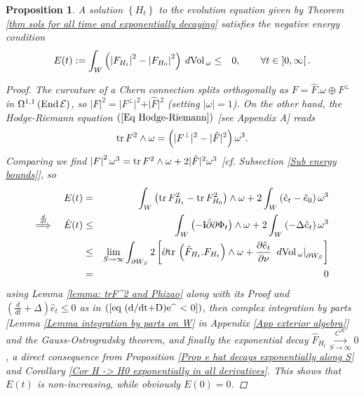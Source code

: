 \documentclass{article}
\newcommand{\func}[1]{\textnormal {#1\,}}
\newcommand{\tublim}{\overset{C^\infty}{\underset{S\rightarrow\infty}{\longrightarrow}}}
\newcommand{\dvol}{\:d\func{Vol}_\omega}
\newtheorem{proposition}[theorem]{Proposition}
\begin{document}
\begin{proposition}     \label{prop negative energy} 
A solution $\left\{H_t\right\}$ to the evolution equation
given by \emph{Theorem \ref{thm sols for all time and exponentially decaying}} satisfies
the \emph{negative energy} condition\begin{eqnarray}        \label{eq uniform energy bound}
        E(t):= \int_{W}
        \left( 
        \left\vert F_{H_{t}}\right\vert^{2}
        -
        \left\vert F_{H_{0}}\right\vert ^{2}
        \right) \dvol%
        &\leq& 
        0,\qquad \forall t\in \left]0,\infty \right[.
\end{eqnarray}%
\begin{proof}
The curvature of a Chern connection splits orthogonally as $F=\hat{F}.\omega  \oplus  F^{\perp }$ in $\Omega ^{1,1}\left( \func{End}\mathcal{E}\right)$, so
$\left\vert F\right\vert ^{2}=\vert F^{\perp }\vert
^{2}+\vert \hat{F}\vert ^{2}$
(setting $\left\vert \omega \right\vert =1$). On the other hand, the Hodge-Riemann  equation $\left( \ref{Eq Hodge-Riemann}\right) $ [see \emph{Appendix A}] reads
 \begin{equation*}
        \func{tr}F^{2}\wedge \omega 
        =\left( \vert F^{\perp }\vert^{2}
        -\vert \hat{F}\vert ^{2}\right) \omega ^{3}.
\end{equation*}%
Comparing we find $\left\vert F\right\vert ^{2}\omega ^{3}=\func{tr}F^{2}\wedge \omega +2\vert \hat{F}\vert ^{2}\omega ^{3}$ [cf. \emph{Subsection \ref{Sub energy bounds}}], so
\begin{eqnarray*}
        E(t)&=&\int_{W}\left(\func{tr}F_{H_{t}}^{2}
        -\func{tr}F_{H_{0}}^{2}\right)\wedge \omega
        +2 \int_{W}\left(\hat{e}_t - \hat{e}_0\right)\omega ^{3}\\
        \overset{\frac{d}{dt}}{\Longrightarrow}\quad
        \dot{E}(t)&\leq&\int_W \left(-\mathbf{i}\bar{\partial}\partial           \Phi_t\right)\wedge\omega +2\int_W\left(-\Delta\hat{e}_t\right)\omega^{3}\\
        &\leq&\lim_{S\rightarrow\infty}\int_{\partial W_S}
        2\left[\partial \func{tr} \left(\hat{F}_{H_t}.F_{H_t}\right)\wedge\omega
        +\frac{\partial\hat{e}_t}{\partial\nu} \left.\dvol\right\vert_{\partial         W_S}\right]\\
        &=&0
\end{eqnarray*}
using \emph{Lemma \ref{lemma: trF^2 and Phizao}}
along with its \emph{Proof} and $\left(\frac{d}{dt}+\Delta\right)\hat{e}_t \leq 0$ as in $(\ref{eq (d/dt+D)e^ < 0})$, then complex integration by parts [\emph{Lemma \ref{Lemma integration by parts on W}} in \emph{Appendix \ref{App exterior algebra}}] and the Gauss-Ostrogradsky theorem, and finally the exponential decay $\hat{F}_{H_t} \tublim 0$, a direct consequence from \emph{Proposition \ref{Prop e hat decays exponentially along S}} and \emph{Corollary \ref{Cor H -> H0 exponentially in all derivatives}}. This shows that $E(t)$ is non-increasing, while obviously $E(0)=0$.
\end{proof}
\end{proposition}
\end{document}
